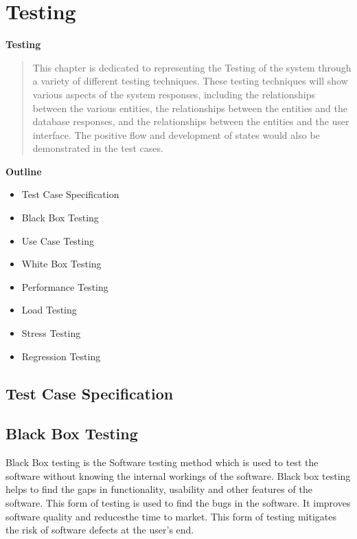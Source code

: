 
\section{Testing}

\vspace{20mm}


\Huge{\textbf{Testing}}

\vspace{20mm}


\begin{abstract}

    This chapter is dedicated to representing the Testing of the system
    through a variety of different testing techniques. These testing techniques will show
    various aspects of the system responses, including the relationships between the
    various entities, the relationships between the entities and the database responses,
    and the relationships between the entities and the user interface.
    The positive flow and development of states would also be demonstrated in the test cases.


\end{abstract}

\vspace{20mm}

\large{\textbf{Outline}}

\begin{center}
    \begin{itemize}
        \item Test Case Specification
        \item Black Box Testing
        \item Use Case Testing
        \item White Box Testing
        \item Performance Testing
        \item Load Testing
        \item Stress Testing
        \item Regression Testing
    \end{itemize}
\end{center}
\pagebreak


\subsection{Test Case Specification}

\subsection{ Black Box Testing}
Black Box testing is the Software testing method which is used to test the software without knowing the internal workings of the software.
Black box testing helps to find the gaps in functionality, usability and other features of the software. This form of testing is used to find the bugs in the software.
It improves software quality and reducesthe time to market. This form of testing mitigates the risk of software defects at the user's end.

